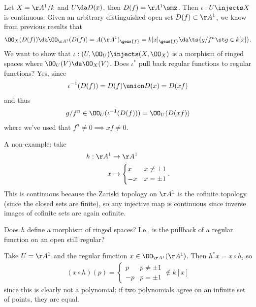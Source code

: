 \begin{example}

Let \(X = \AA^1/k\) and \(U \da D(x)\), then \(D(f) = \AA^1\smz\). Then
\(\iota: U\injects X\) is continuous. Given an arbitrary distinguished
open set \(D(f) \subset \AA^1\), we know from previous results that
\begin{align*}  
\OO_X(D(f)) \da \OO_{\AA^1}(D(f)) = A(\AA^1)_{\gens{f}} = k[x]_{\gens{f}} \da \ts{g/f^n \st g\in k[x]}
.\end{align*} We want to show that
\(\iota: (U, \OO_U) \injects (X, \OO_X)\) is a morphism of ringed spaces
where \(\OO_U(V) \da \OO_X(V)\). Does \(\iota^*\) pull back regular
functions to regular functions? Yes, since
\begin{align*}
\iota^{-1} (D(f)) = D(f) \union D(x) = D(xf)
\end{align*} and thus
\begin{align*}
g/f^n \in \OO_U(\iota^{-1}(D(f))) = \OO_U(D(xf))
\end{align*} where we've used that \(f^n \neq 0 \implies xf\neq 0\).

\end{example}

\begin{example}

A non-example: take
\begin{align*}  
h: \AA^1 &\to \AA^1 \\
x & \mapsto 
\begin{cases}
x & x \neq \pm 1 \\
-x & x= \pm 1
\end{cases}
.\end{align*} This is continuous because the Zariski topology on
\(\AA^1\) is the cofinite topology (since the closed sets are finite),
so any injective map is continuous since inverse images of cofinite sets
are again cofinite.

\begin{question}

Does \(h\) define a morphism of ringed spaces? I.e., is the pullback of
a regular function on an open still regular?

\end{question}

\begin{answer}

Take \(U = \AA^1\) and the regular function \(x\in \OO_{\AA^1}(\AA^1)\).
Then \(h^*x = x\circ h\), so
\begin{align*}  
(x\circ h)(p) =
\begin{cases}
p & p\neq \pm 1 \\
-p & p= \pm 1 
\end{cases}
\not \in k[x]
\end{align*} since this is clearly not a polynomial: if two polynomials
agree on an infinite set of points, they are equal.

\end{answer}

\end{example}

